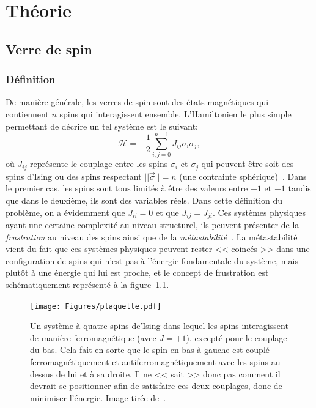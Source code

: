 \part{Théorie}\label{part:theory}

\chapter{Verre de spin} \label{ch:spin-glass}
\section{Définition} \label{sec:spin-glass}
De manière générale, les verres de spin sont des états magnétiques qui contiennent $n$ spins qui interagissent ensemble.
L'Hamiltonien le plus simple permettant de décrire un tel système est le suivant:
\begin{equation}
    \mathcal{H} = -\frac{1}{2}\sum_{i,j = 0}^{n-1}J_{ij}\sigma_i\sigma_j,
\end{equation}
où $J_{ij}$ représente le couplage entre les spins $\sigma_i$ et $\sigma_j$ qui peuvent être soit des spins d'Ising ou des spins respectant $||\vec{\sigma}|| = n$ (une contrainte sphérique)~\cite{EAspinglass, spherical-model-spinglass}.
Dans le premier cas, les spins sont tous limités à être des valeurs entre $+1$ et $-1$ tandis que dans le deuxième, ils sont des variables réels.
Dans cette définition du problème, on a évidemment que $J_{ii} = 0$ et que $J_{ij} = J_{ji}$.
Ces systèmes physiques ayant une certaine complexité au niveau structurel, ils peuvent présenter de la \emph{frustration} au niveau des spins ainsi que de la \emph{métastabilité}~\cite{stein2013spin}.
La métastabilité vient du fait que ces systèmes physiques peuvent rester << coincés >> dans une configuration de spins qui n'est pas à l'énergie fondamentale du système, mais plutôt à une énergie qui lui est proche, et le concept de frustration est schématiquement représenté à la figure~\ref{fig:spin-glass-frustration}.
\begin{figure}[h]
    \centering
    \texttt{[image: Figures/plaquette.pdf]}
    \caption[Un système à quatre spins d'Ising dans lequel les spins interagissent de manière ferromagnétique (avec $J = +1$), excepté pour le couplage du bas. Cela fait en sorte que le spin en-bas à gauche est couplé ferromagnétiquement et antiferromagnétiquement avec les spins au-dessus de lui et à sa droite. Il ne << sait >> donc pas comment il devrait se positionner afin de satisfaire ces deux couplages, donc de minimiser l'énergie.]{Un système à quatre spins de'Ising dans lequel les spins interagissent de manière ferromagnétique (avec $J = +1$), excepté pour le couplage du bas. Cela fait en sorte que le spin en bas à gauche est couplé ferromagnétiquement et antiferromagnétiquement avec les spins au-dessus de lui et à sa droite. Il ne << sait >> donc pas comment il devrait se positionner afin de satisfaire ces deux couplages, donc de minimiser l'énergie. Image tirée de~\protect\cite{altieri2023introduction}.}
    \label{fig:spin-glass-frustration}
\end{figure}
